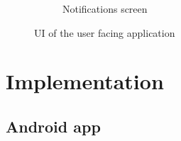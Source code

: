 \documentclass[conference]{IEEEtran}
\begin{document}
\begin{figure}[t]
\begin{subfigure}{0.24\textwidth}
	\caption{Notifications screen}
	\label{fig:screen4}
	\end{subfigure}
\caption{UI of the user facing application}\label{fig:screens}
\end{figure}

\section{Implementation}
\subsection{Android app}

\end{document}
